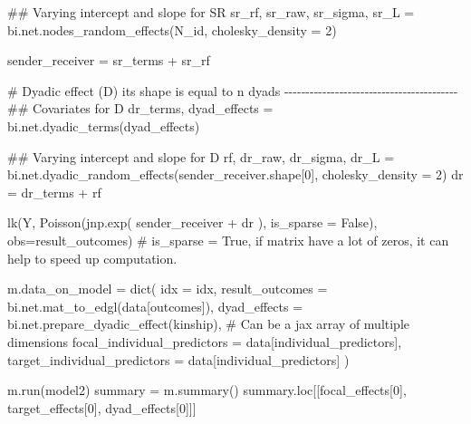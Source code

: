 \documentclass[
  letterpaper,
  DIV=11,
  numbers=noendperiod]{scrreprt}
\newenvironment{Shaded}{\begin{snugshade}}{\end{snugshade}}
\newcommand{\BuiltInTok}[1]{\textcolor[rgb]{0.00,0.23,0.31}{#1}}
\newcommand{\CommentTok}[1]{\textcolor[rgb]{0.37,0.37,0.37}{#1}}
\newcommand{\DecValTok}[1]{\textcolor[rgb]{0.68,0.00,0.00}{#1}}
\newcommand{\NormalTok}[1]{\textcolor[rgb]{0.00,0.23,0.31}{#1}}
\newcommand{\OperatorTok}[1]{\textcolor[rgb]{0.37,0.37,0.37}{#1}}
\newcommand{\StringTok}[1]{\textcolor[rgb]{0.13,0.47,0.30}{#1}}
\newcommand{\VariableTok}[1]{\textcolor[rgb]{0.07,0.07,0.07}{#1}}
\begin{document}
\begin{tcolorbox}
\begin{Shaded}
\begin{Highlighting}[]
    \CommentTok{\#\# Varying intercept and slope for SR}
\NormalTok{    sr\_rf, sr\_raw, sr\_sigma, sr\_L }\OperatorTok{=}\NormalTok{ bi.net.nodes\_random\_effects(N\_id, cholesky\_density }\OperatorTok{=} \DecValTok{2}\NormalTok{) }

\NormalTok{    sender\_receiver }\OperatorTok{=}\NormalTok{ sr\_terms }\OperatorTok{+}\NormalTok{ sr\_rf}

    \CommentTok{\# Dyadic effect (D) its shape is equal to n dyads {-}{-}{-}{-}{-}{-}{-}{-}{-}{-}{-}{-}{-}{-}{-}{-}{-}{-}{-}{-}{-}{-}{-}{-}{-}{-}{-}{-}{-}{-}{-}{-}{-}{-}{-}{-}{-}{-}{-}{-}{-}}
    \CommentTok{\#\# Covariates for D}
\NormalTok{    dr\_terms, dyad\_effects }\OperatorTok{=}\NormalTok{ bi.net.dyadic\_terms(dyad\_effects)}

    \CommentTok{\#\# Varying intercept and slope for D}
\NormalTok{    rf, dr\_raw, dr\_sigma, dr\_L }\OperatorTok{=}\NormalTok{ bi.net.dyadic\_random\_effects(sender\_receiver.shape[}\DecValTok{0}\NormalTok{], cholesky\_density }\OperatorTok{=} \DecValTok{2}\NormalTok{)}
\NormalTok{    dr }\OperatorTok{=}\NormalTok{ dr\_terms }\OperatorTok{+}\NormalTok{ rf}

\NormalTok{    lk(}\StringTok{\textquotesingle{}Y\textquotesingle{}}\NormalTok{, Poisson(jnp.exp( sender\_receiver }\OperatorTok{+}\NormalTok{ dr ), is\_sparse }\OperatorTok{=} \VariableTok{False}\NormalTok{), obs}\OperatorTok{=}\NormalTok{result\_outcomes) }\CommentTok{\# is\_sparse = True, if matrix have a lot of zeros, it can help to speed up computation.}

\NormalTok{m.data\_on\_model }\OperatorTok{=} \BuiltInTok{dict}\NormalTok{(}
\NormalTok{    idx }\OperatorTok{=}\NormalTok{ idx,}
\NormalTok{    result\_outcomes }\OperatorTok{=}\NormalTok{ bi.net.mat\_to\_edgl(data[}\StringTok{\textquotesingle{}outcomes\textquotesingle{}}\NormalTok{]), }
\NormalTok{    dyad\_effects }\OperatorTok{=}\NormalTok{ bi.net.prepare\_dyadic\_effect(kinship), }\CommentTok{\# Can be a jax array of multiple dimensions}
\NormalTok{    focal\_individual\_predictors }\OperatorTok{=}\NormalTok{ data[}\StringTok{\textquotesingle{}individual\_predictors\textquotesingle{}}\NormalTok{],}
\NormalTok{    target\_individual\_predictors }\OperatorTok{=}\NormalTok{ data[}\StringTok{\textquotesingle{}individual\_predictors\textquotesingle{}}\NormalTok{]}
\NormalTok{)}

\NormalTok{m.run(model2) }
\NormalTok{summary }\OperatorTok{=}\NormalTok{ m.summary()}
\NormalTok{summary.loc[[}\StringTok{\textquotesingle{}focal\_effects[0]\textquotesingle{}}\NormalTok{, }\StringTok{\textquotesingle{}target\_effects[0]\textquotesingle{}}\NormalTok{, }\StringTok{\textquotesingle{}dyad\_effects[0]\textquotesingle{}}\NormalTok{]]}
\end{Highlighting}
\end{Shaded}


\end{tcolorbox}
\end{document}
